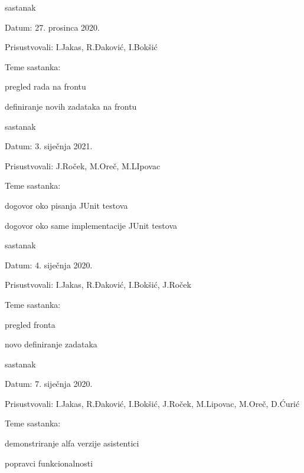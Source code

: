 \begin{packed_enum}
		\item  sastanak
		\item[] \begin{packed_item}
			\item Datum: 27. prosinca 2020.
			\item Prisustvovali: I.Jakas, R.Đaković, I.Bokšić
			\item Teme sastanka:
			\begin{packed_item}
				\item pregled rada na frontu
				\item definiranje novih zadataka na frontu
			\end{packed_item}
		\end{packed_item}
		
			\item  sastanak
		\item[] \begin{packed_item}
			\item Datum: 3. siječnja 2021.
			\item Prisustvovali: J.Roček, M.Oreč, M.LIpovac
			\item Teme sastanka:
			\begin{packed_item}
				\item dogovor oko pisanja JUnit testova
			    \item dogovor oko same implementacije JUnit testova
			\end{packed_item}
		\end{packed_item}
		
		\item  sastanak
		\item[] \begin{packed_item}
			\item Datum: 4. siječnja 2020.
			\item Prisustvovali: I.Jakas, R.Đaković, I.Bokšić, J.Roček
			\item Teme sastanka:
			\begin{packed_item}
				\item pregled fronta 
				\item novo definiranje zadataka
			\end{packed_item}
		\end{packed_item}
		
		\item  sastanak
		\item[] \begin{packed_item}
			\item Datum: 7. siječnja 2020.
			\item Prisustvovali: I.Jakas, R.Đaković, I.Bokšić, J.Roček, M.Lipovac, M.Oreč, D.Ćurić
			\item Teme sastanka:
			\begin{packed_item}
				\item demonstriranje alfa verzije asistentici 
				\item popravci funkcionalnosti
			\end{packed_item}
		\end{packed_item}
		

\end{packed_enum}
